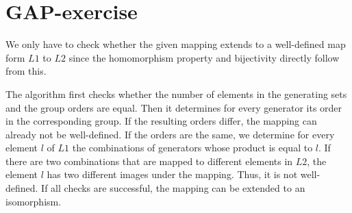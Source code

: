 \section{GAP-exercise}

We only have to check whether the given mapping extends to a well-defined map form $L1$ to $L2$ since the homomorphism property and bijectivity directly follow from this.

The algorithm first checks whether the number of elements in the generating sets and the group orders are equal. Then it determines for every generator its order in the corresponding group. If the resulting orders differ, the mapping can already not be well-defined. If the orders are the same, we determine for every element $l$ of $L1$ the combinations of generators whose product is equal to $l$. If there are two combinations that are mapped to different elements in $L2$, the element $l$ has two different images under the mapping. Thus, it is not well-defined. If all checks are successful, the mapping can be extended to an isomorphism.

\hspace*{-3cm}
